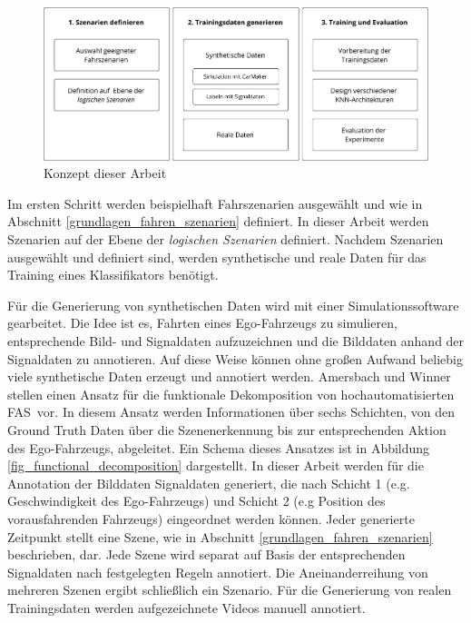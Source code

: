 \begin{figure}[h]
\centering
\includegraphics[scale=0.6]{images/konzept_struktur.pdf}
\caption{Konzept dieser Arbeit}
\label{fig_konzept_struktur}
\end{figure}

Im ersten Schritt werden beispielhaft Fahrszenarien ausgewählt und wie in Abschnitt \ref{grundlagen_fahren_szenarien} definiert. In dieser Arbeit werden Szenarien auf der Ebene der \textit{logischen Szenarien} definiert. Nachdem Szenarien ausgewählt und definiert sind, werden synthetische und reale Daten für das Training eines Klassifikators benötigt.

Für die Generierung von synthetischen Daten wird mit einer Simulationssoftware gearbeitet. Die Idee ist es, Fahrten eines Ego-Fahrzeugs zu simulieren, entsprechende Bild- und Signaldaten aufzuzeichnen und die Bilddaten anhand der Signaldaten zu annotieren. Auf diese Weise können ohne großen Aufwand beliebig viele synthetische Daten erzeugt und annotiert werden. Amersbach und Winner \cite{amersbach2017functional} stellen einen Ansatz für die funktionale Dekomposition von hochautomatisierten \ac{FAS} vor. In diesem Ansatz werden Informationen über sechs Schichten, von den Ground Truth Daten über die Szenenerkennung bis zur entsprechenden Aktion des Ego-Fahrzeugs, abgeleitet. Ein Schema dieses Ansatzes ist in Abbildung \ref{fig_functional_decomposition} dargestellt. In dieser Arbeit werden für die Annotation der Bilddaten Signaldaten generiert, die nach Schicht 1 (e.g. Geschwindigkeit des Ego-Fahrzeugs) und Schicht 2 (e.g Position des vorausfahrenden Fahrzeugs) eingeordnet werden können. Jeder generierte Zeitpunkt stellt eine Szene, wie in Abschnitt \ref{grundlagen_fahren_szenarien} beschrieben, dar. Jede Szene wird separat auf Basis der entsprechenden Signaldaten nach festgelegten Regeln annotiert. Die Aneinanderreihung von mehreren Szenen ergibt schließlich ein Szenario. Für die Generierung von realen Trainingsdaten werden aufgezeichnete Videos manuell annotiert.

